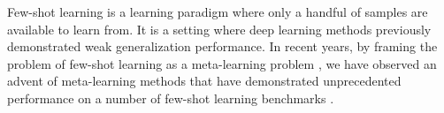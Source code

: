 \documentclass{article} \usepackage[dvipsnames]{xcolor}
\begin{document}
\begin{comment}
Humans can learn from a few data-points and generalize very well, but also have the ability to adapt in real-time to information from an incoming task. For example, knowing that the test time examples should not be confusing may cause one to attend to features that increase the separability of classes. Even if turtles and tortoises may be hard to distinguish from textbook examples, unlabelled experience can enable us to associate turtles with water, and hence improve the features we attend to in an image. We wish to incorporate this ability to adapt into a meta-learning context

More specifically, a human looking at a number of different images of different types of animals, will form an initial notion of what each animal is. Then, when given test images (without ground truth labels) from the same types of animals, the human, upon facing the test task, might come to realise that perhaps some of the naively formed notions might be slightly off from reality. They will adapt those original notions to improve their generalization performance. For a concrete example, let us imagine that a human being is looking at three images, a white house cat, a brown german shepherd and a zebra. The human, forms naive notions of what category each animal is in. For example, the house cat might belong to a class of felines, house cats, in-door pets, or simply white animals. For each image seen, the human can form a number of different features that can successfully describe said class. Then, when the human receives the test samples, they can see images of lions, leopards, wolves, horses and elephants. At this point they realise that the naive class notions they had previously formed need to be adjusted, since cats, leopards and lions can be confidently classified as felines, whereas classifying them as house cats or in-door pets would fail to describe all observed data-points, wolves and german shepherds can be classified as canines, whereas horses and zebras can form their own classes. 

This ability, to adjust notions in light of new, unlabeled data, is a prime characteristic of human intelligence.
\end{comment}


Few-shot learning is a learning paradigm where only a handful of samples are available to learn from. It is a setting where deep learning methods previously demonstrated weak generalization performance. In recent years, by framing the problem of few-shot learning as a meta-learning problem \citep{vinyals2016matching}, we have observed an advent of meta-learning methods that have demonstrated 
unprecedented performance on a number of few-shot learning benchmarks 
\citep{snell2017prototypical, finn2017model, rusu2018meta}.
\end{document}
